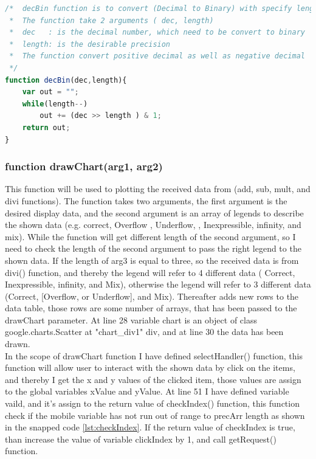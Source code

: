\documentclass[11pt]{article}
\begin{document}
\begin{lstlisting}[label={lst:decBin}, language=Javascript, caption={Convert (Decimal to Binary) with specify length of the output},]
/*	decBin function is to convert (Decimal to Binary) with specify length of the output.
 *	The function take 2 arguments ( dec, length)
 *	dec   : is the decimal number, which need to be convert to binary
 *	length: is the desirable precision 
 *	The function convert positive decimal as well as negative decimal 
 */
function decBin(dec,length){
	var out = "";
	while(length--)
		out += (dec >> length ) & 1;
	return out;
}
\end{lstlisting}

\subsubsection{function drawChart(arg1, arg2) }
This function will be used to plotting the received data from (add, sub, mult, and divi functions). The function takes two arguments, the first argument is the desired display data, and the second argument is an array of legends to describe the shown data (e.g. correct, Overflow , Underflow, , Inexpressible, infinity, and mix). While the function will get different length of the second argument, so I need to check the length of the second argument to pass the right legend to the shown data. If the length of arg3 is equal to three, so the received data is from divi() function, and thereby the legend will refer to 4 different data ( Correct, Inexpressible, infinity, and Mix), otherwise the legend will refer to 3 different data (Correct, [Overflow, or Underflow], and Mix). Thereafter adds new rows to the data table, those rows are some number of arrays, that has been passed to the drawChart parameter. At line 28 variable chart is an object of class google.charts.Scatter at "chart\_div1" div, and at line 30 the data has been drawn.\\

In the scope of drawChart function I have defined selectHandler() function, this function will allow user to interact with the shown data by click on the items, and thereby I get the x and y values of the clicked item, those values are assign to the global variables xValue and yValue. At line 51 I have defined variable vaild, and it's assign to the return value of checkIndex() function, this function check if the mobile variable has not run out of range to precArr length as shown in the snapped code \ref{lst:checkIndex}. If the return value of checkIndex is true, than increase the value of variable clickIndex by 1, and call getRequest() function.
\end{document}
